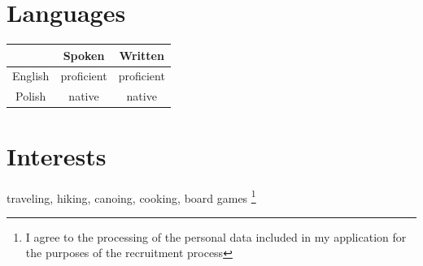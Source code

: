 \documentclass{report}
\begin{document}
\section{Languages}
\begin{tabular}{ccc}
	&Spoken &Written\\
	\hline
	English &proficient &proficient\\
	Polish &native &native\\
\end{tabular}

\section{Interests}
traveling,  hiking, canoing, cooking, board games
\footnote{I agree to the processing of the personal data included
in my application for the purposes of the recruitment process}
\end{document}
